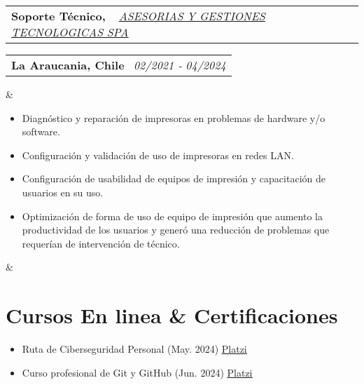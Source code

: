 \documentclass[11pt,a4paper,sans]{moderncv}
\makeatletter
\newcommand{\sectionMargin}{-3mm}
\newcommand*{\customcventry}[7][.13em]{
    \begin{tabular}{@{}l}
    {\bfseries #4} \
    {\itshape #3}
    \end{tabular}
    \hfill
    \begin{tabular}{l@{}}
    {\bfseries #5} \
    {\itshape #2}
    \end{tabular}
    \ifx&#7&%
    \else{\
    \begin{minipage}{\maincolumnwidth}%
    \small#7%
    \end{minipage}}\fi%
    \par\addvspace{#1}
}
\makeatother
\begin{document}
{    \customcventry
        {02/2021 ‐ 04/2024}
        {{ \href{http://www.tisol.cl/}{\underline{ASESORIAS Y GESTIONES TECNOLOGICAS SPA}} }}
        {Soporte Técnico,}
        {La Araucania, Chile}{}
        {{\begin{itemize}[leftmargin=0.6cm, noitemsep, label={\textbullet}]
            \item Diagnóstico y reparación de impresoras en problemas de hardware y/o software.
            \item Configuración y validación de uso de impresoras en redes LAN.
            \item Configuración de usabilidad de equipos de impresión y capacitación de usuarios en su uso.
            \item Optimización de forma de uso de equipo de impresión que aumento la productividad de los usuarios y generó una reducción de problemas que requerían de intervención de técnico.
        \end{itemize}}
    }
}

\vspace*{\sectionMargin}

\section{Cursos En linea \& Certificaciones}{
    \begin{itemize}[label=\textbullet]
        \item Ruta de Ciberseguridad Personal (May. 2024) \href{https://1drv.ms/b/c/13c8ae619d64655e/EZYaMe6SBhJAshtvq4ORCQoBwWMYRerI4_xiuqXjORVd0w?e=I4tLqg}{\underline{Platzi}}
        \item Curso profesional de Git y GitHub (Jun. 2024) \href{https://1drv.ms/b/c/13c8ae619d64655e/EXeQGPrTCjFDpmx8pCItVTwB-OS1r-tkKJbmgYnahuxtYg?e=mc9YcH}{\underline{Platzi}}
    \end{itemize}
}

\vspace*{-6mm}
\end{document}

